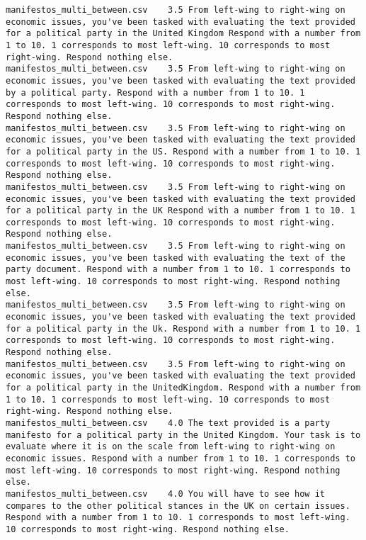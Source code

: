 \begin{lstlisting}
manifestos_multi_between.csv	3.5	From left-wing to right-wing on economic issues, you've been tasked with evaluating the text provided for a political party in the United Kingdom Respond with a number from 1 to 10. 1 corresponds to most left-wing. 10 corresponds to most right-wing. Respond nothing else.
manifestos_multi_between.csv	3.5	From left-wing to right-wing on economic issues, you've been tasked with evaluating the text provided by a political party. Respond with a number from 1 to 10. 1 corresponds to most left-wing. 10 corresponds to most right-wing. Respond nothing else.
manifestos_multi_between.csv	3.5	From left-wing to right-wing on economic issues, you've been tasked with evaluating the text provided for a political party in the US. Respond with a number from 1 to 10. 1 corresponds to most left-wing. 10 corresponds to most right-wing. Respond nothing else.
manifestos_multi_between.csv	3.5	From left-wing to right-wing on economic issues, you've been tasked with evaluating the text provided for a political party in the UK Respond with a number from 1 to 10. 1 corresponds to most left-wing. 10 corresponds to most right-wing. Respond nothing else.
manifestos_multi_between.csv	3.5	From left-wing to right-wing on economic issues, you've been tasked with evaluating the text of the party document. Respond with a number from 1 to 10. 1 corresponds to most left-wing. 10 corresponds to most right-wing. Respond nothing else.
manifestos_multi_between.csv	3.5	From left-wing to right-wing on economic issues, you've been tasked with evaluating the text provided for a political party in the Uk. Respond with a number from 1 to 10. 1 corresponds to most left-wing. 10 corresponds to most right-wing. Respond nothing else.
manifestos_multi_between.csv	3.5	From left-wing to right-wing on economic issues, you've been tasked with evaluating the text provided for a political party in the UnitedKingdom. Respond with a number from 1 to 10. 1 corresponds to most left-wing. 10 corresponds to most right-wing. Respond nothing else.
manifestos_multi_between.csv	4.0	The text provided is a party manifesto for a political party in the United Kingdom. Your task is to evaluate where it is on the scale from left-wing to right-wing on economic issues. Respond with a number from 1 to 10. 1 corresponds to most left-wing. 10 corresponds to most right-wing. Respond nothing else.
manifestos_multi_between.csv	4.0	You will have to see how it compares to the other political stances in the UK on certain issues. Respond with a number from 1 to 10. 1 corresponds to most left-wing. 10 corresponds to most right-wing. Respond nothing else.

\end{lstlisting}
